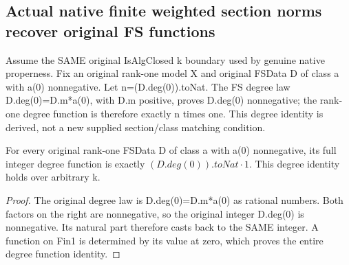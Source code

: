 \subsection{Actual native finite weighted section norms recover original FS functions}
Assume the SAME original IsAlgClosed k boundary used by genuine native
properness. Fix an original rank-one model X and original FSData D of
class a with a(0) nonnegative. Let n=(D.deg(0)).toNat. The FS degree law
D.deg(0)=D.m*a(0), with D.m positive, proves D.deg(0) nonnegative; the
rank-one degree function is therefore exactly n times one. This degree
identity is derived, not a new supplied section/class matching condition.

\begin{lemma}
\label{lem:seven-native-fs-natural-degree}
\leanok
For every original rank-one FSData D of class a with a(0) nonnegative,
its full integer degree function is exactly
$(D.deg(0)).toNat\cdot1$. This degree identity holds over arbitrary k.
\end{lemma}
\begin{proof}
The original degree law is D.deg(0)=D.m*a(0) as rational numbers.
Both factors on the right are nonnegative, so the original integer
D.deg(0) is nonnegative. Its natural part therefore casts back to the
SAME integer. A function on Fin1 is determined by its value at zero,
which proves the entire degree function identity.
\end{proof}

